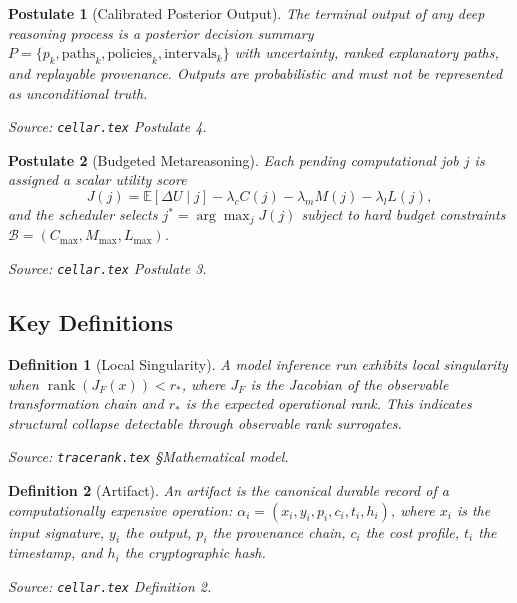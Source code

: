 \documentclass[11pt]{article}
\newtheorem{postulate}{Postulate}
\newtheorem{definition}{Definition}
\theoremstyle{remark}
\newcommand{\budget}{\mathcal{B}}
\begin{document}
\begin{postulate}[Calibrated Posterior Output]
\label{post:posterior}
The terminal output of any deep reasoning process is a posterior decision summary $P = \{p_k, \mathrm{paths}_k, \mathrm{policies}_k, \mathrm{intervals}_k\}$ with uncertainty, ranked explanatory paths, and replayable provenance. Outputs are probabilistic and must not be represented as unconditional truth.
\end{postulate}

\noindent\textit{Source: \texttt{cellar.tex} Postulate 4.}

\begin{postulate}[Budgeted Metareasoning]
\label{post:budget}
Each pending computational job $j$ is assigned a scalar utility score
\[
J(j) = \mathbb{E}[\Delta U \mid j] - \lambda_c C(j) - \lambda_m M(j) - \lambda_l L(j),
\]
and the scheduler selects $j^* = \arg\max_j J(j)$ subject to hard budget constraints $\budget = (C_{\max}, M_{\max}, L_{\max})$.
\end{postulate}

\noindent\textit{Source: \texttt{cellar.tex} Postulate 3.}

\subsection{Key Definitions}
\label{subsec:definitions}

\begin{definition}[Local Singularity]
A model inference run exhibits \emph{local singularity} when $\operatorname{rank}(J_F(x)) < r_*$, where $J_F$ is the Jacobian of the observable transformation chain and $r_*$ is the expected operational rank. This indicates structural collapse detectable through observable rank surrogates.
\end{definition}

\noindent\textit{Source: \texttt{tracerank.tex} \S Mathematical model.}

\begin{definition}[Artifact]
An artifact is the canonical durable record of a computationally expensive operation: $\alpha_i = (x_i, y_i, p_i, c_i, t_i, h_i)$, where $x_i$ is the input signature, $y_i$ the output, $p_i$ the provenance chain, $c_i$ the cost profile, $t_i$ the timestamp, and $h_i$ the cryptographic hash.
\end{definition}

\noindent\textit{Source: \texttt{cellar.tex} Definition 2.}
\end{document}
